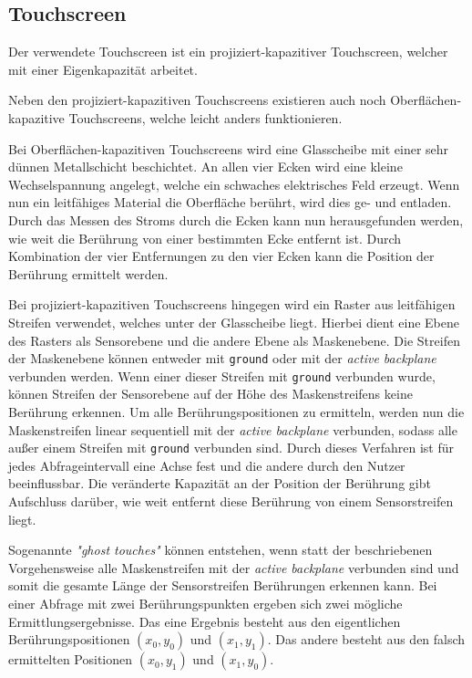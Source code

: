 \subsection{Touchscreen}

Der verwendete Touchscreen ist ein projiziert-kapazitiver Touchscreen, welcher mit einer Eigenkapazität arbeitet. \cite[\itshape4.4~Touch~panel]{ts-userManual}

Neben den projiziert-kapazitiven Touchscreens existieren auch noch Oberflächen-kapazitive Touchscreens, welche leicht anders funktionieren.

Bei Oberflächen-kapazitiven Touchscreens wird eine Glasscheibe mit einer sehr dünnen Metallschicht beschichtet.
An allen vier Ecken wird eine kleine Wechselspannung angelegt, welche ein schwaches elektrisches Feld erzeugt.
Wenn nun ein leitfähiges Material die Oberfläche berührt, wird dies ge- und entladen.
Durch das Messen des Stroms durch die Ecken kann nun herausgefunden werden, wie weit die Berührung von einer bestimmten Ecke entfernt ist.
Durch Kombination der vier Entfernungen zu den vier Ecken kann die Position der Berührung ermittelt werden.
\cite[\itshape8~Findings~and~Discussion]{ts-holzinger}

Bei projiziert-kapazitiven Touchscreens hingegen wird ein Raster aus leitfähigen Streifen verwendet, welches unter der Glasscheibe liegt.
Hierbei dient eine Ebene des Rasters als Sensorebene und die andere Ebene als Maskenebene.
Die Streifen der Maskenebene können entweder mit \texttt{ground} oder mit der \textit{active backplane} verbunden werden.
Wenn einer dieser Streifen mit \texttt{ground} verbunden wurde, können Streifen der Sensorebene auf der Höhe des Maskenstreifens keine Berührung erkennen.
Um alle Berührungspositionen zu ermitteln, werden nun die Maskenstreifen linear sequentiell mit der \textit{active backplane} verbunden, sodass alle außer einem Streifen mit \texttt{ground} verbunden sind.
Durch dieses Verfahren ist für jedes Abfrageintervall eine Achse fest und die andere durch den Nutzer beeinflussbar.
Die veränderte Kapazität an der Position der Berührung gibt Aufschluss darüber, wie weit entfernt diese Berührung von einem Sensorstreifen liegt.
\cite{ts-self_capacitive_multitouch}

Sogenannte \textit{"ghost touches"} können entstehen, wenn statt der beschriebenen Vorgehensweise alle Maskenstreifen mit der \textit{active backplane} verbunden sind und somit die gesamte Länge der Sensorstreifen Berührungen erkennen kann.
Bei einer Abfrage mit zwei Berührungspunkten ergeben sich zwei mögliche Ermittlungsergebnisse.
Das eine Ergebnis besteht aus den eigentlichen Berührungspositionen $(x_0,y_0)$ und $(x_1,y_1)$.
Das andere besteht aus den falsch ermittelten Positionen $(x_0,y_1)$ und $(x_1,y_0)$.

